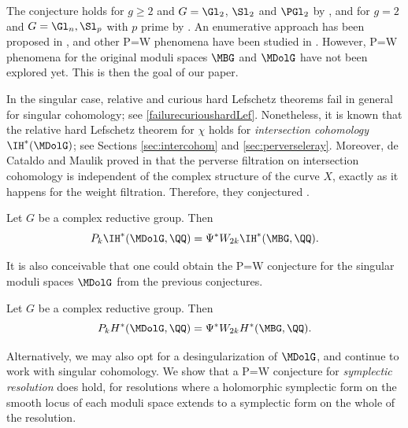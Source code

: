 The conjecture holds for $g\geq 2$ and $G=\Gl_2$, $\Sl_2$ and $\PGl_2$ by \cite{deCataldoHauselMigliorini2012}, and for $g=2$ and $G=\Gl_n, \Sl_p$ with $p$ prime by \cite{deCataldoMaulikShen2019, deCataldoMaulikShen2020}. An enumerative approach has been proposed in \cite{CHS2020}, and other P=W phenomena have been studied in
\cite{ShenZhang2018, ShenYin2018, FelisettiShenYin2021, ZhangZili2019, Szabo2018, Szabo2019, NemethiSzabo2020, HKP2019, Harder2019, HLSY2019, Mauri2021}.
However, P=W phenomena for the original moduli spaces $\MBG$ and $\MDolG$ have not been explored yet. This is then the goal of our paper.

In the singular case, relative and curious hard Lefschetz theorems fail in general for singular cohomology; see \cref{failurecurioushardLef}. Nonetheless, it is known that the relative hard Lefschetz theorem for $\chi$ holds for \emph{intersection cohomology} $\IH^*(\MDolG)$; see Sections \ref{sec:intercohom} and \ref{sec:perverseleray}.
Moreover, de Cataldo and Maulik proved in \cite{deCataldoMaulik2018} that the perverse filtration on intersection cohomology is independent of the complex structure of the curve $X$, exactly as it happens for the weight filtration. Therefore, they conjectured \cite[Quest.\,4.1.7]{deCataldoMaulik2018}.

\begin{conj}[PI=WI conjecture]\label{PI=WIconj} Let $G$ be a complex reductive group. Then
\[
P_k \IH^*(\MDolG, \QQ)= \Psi^* W_{2k}\IH^*(\MBG, \QQ).
\]
\end{conj}

It is also conceivable that one could obtain the P=W conjecture for the singular moduli spaces $\MDolG$ from the previous conjectures.
\begin{conj}[P=W conjecture for singular moduli spaces] \label{P=Wsing} Let $G$ be a complex reductive group. Then
\[
P_kH^*(\MDolG, \QQ) = {\Psi}^* W_{2k}H^*(\MBG, \QQ).
\]
\end{conj}

Alternatively, we may also opt for a desingularization of $\MDolG$, and continue to work with singular cohomology. We show that a P=W conjecture for \emph{symplectic resolution} does hold, \ie for resolutions where a holomorphic symplectic form on the smooth locus of each moduli space extends to a symplectic form on the whole of the resolution.

